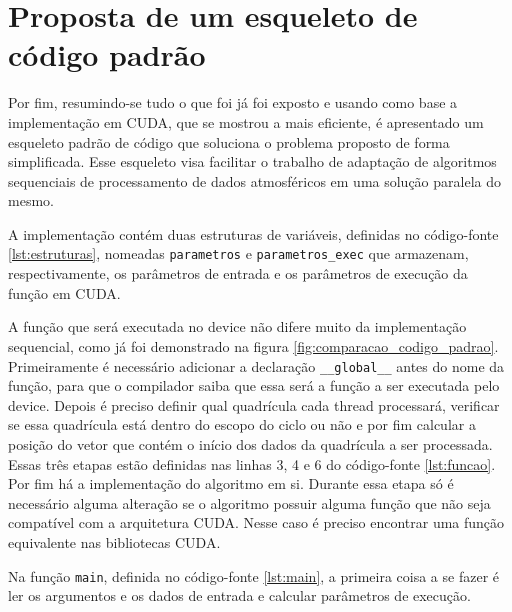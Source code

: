 \chapter{Proposta de um esqueleto de código padrão}

Por fim, resumindo-se tudo o que foi já foi exposto e usando como base a implementação em CUDA, que se mostrou a mais eficiente, é apresentado um esqueleto padrão de código que soluciona o problema proposto de forma simplificada. Esse esqueleto visa facilitar o trabalho de adaptação de algoritmos sequenciais de processamento de dados atmosféricos em uma solução paralela do mesmo.

A implementação contém duas estruturas de variáveis, definidas no código-fonte \ref{lst:estruturas}, nomeadas \texttt{parametros} e \texttt{parametros\_exec} que armazenam, respectivamente, os parâmetros de entrada e os parâmetros de execução da função em CUDA.



A função que será executada no device não difere muito da implementação sequencial, como já foi demonstrado na figura \ref{fig:comparacao_codigo_padrao}. Primeiramente é necessário adicionar a declaração \texttt{\_\_global\_\_} antes do nome da função, para que o compilador saiba que essa será a função a ser executada pelo device. Depois é preciso definir qual quadrícula cada thread processará, verificar se essa quadrícula está dentro do escopo do ciclo ou não e por fim calcular a posição do vetor que contém o início dos dados da quadrícula a ser processada. Essas três etapas estão definidas nas linhas 3, 4 e 6 do código-fonte \ref{lst:funcao}. Por fim há a implementação do algoritmo em si. Durante essa etapa só é necessário alguma alteração se o algoritmo possuir alguma função que não seja compatível com a arquitetura CUDA. Nesse caso é preciso encontrar uma função equivalente nas bibliotecas CUDA.



Na função \texttt{main}, definida no código-fonte \ref{lst:main}, a primeira coisa a se fazer é ler os argumentos e os dados de entrada e calcular parâmetros de execução.


